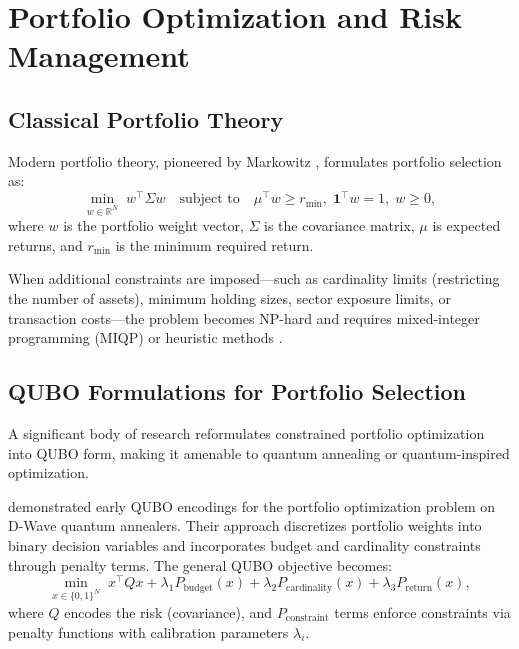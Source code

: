 \documentclass[12pt]{article}
\numberwithin{equation}{section}
\begin{document}
\section{Portfolio Optimization and Risk Management}
\label{sec:portfolio_opt}

\subsection{Classical Portfolio Theory}

Modern portfolio theory, pioneered by Markowitz \citep{Markowitz1952}, formulates portfolio selection as:
\begin{equation}
\min_{w \in \mathbb{R}^N} \; w^\top \Sigma w \quad \text{subject to} \quad \mu^\top w \geq r_{\min}, \; \mathbf{1}^\top w = 1, \; w \geq 0,
\label{eq:markowitz}
\end{equation}
where $w$ is the portfolio weight vector, $\Sigma$ is the covariance matrix, $\mu$ is expected returns, and $r_{\min}$ is the minimum required return.

When additional constraints are imposed—such as cardinality limits (restricting the number of assets), minimum holding sizes, sector exposure limits, or transaction costs—the problem becomes NP-hard and requires mixed-integer programming (MIQP) or heuristic methods \citep{Chang2000Cardinality}.

\subsection{QUBO Formulations for Portfolio Selection}

A significant body of research reformulates constrained portfolio optimization into QUBO form, making it amenable to quantum annealing or quantum-inspired optimization.

\citet{Elsokkary2017FinancialPortfolio} demonstrated early QUBO encodings for the portfolio optimization problem on D-Wave quantum annealers. Their approach discretizes portfolio weights into binary decision variables and incorporates budget and cardinality constraints through penalty terms. The general QUBO objective becomes:
\begin{equation}
\min_{x \in \{0,1\}^N} \; x^\top Q x + \lambda_1 P_{\text{budget}}(x) + \lambda_2 P_{\text{cardinality}}(x) + \lambda_3 P_{\text{return}}(x),
\label{eq:qubo_portfolio}
\end{equation}
where $Q$ encodes the risk (covariance), and $P_{\text{constraint}}$ terms enforce constraints via penalty functions with calibration parameters $\lambda_i$.
\end{document}
